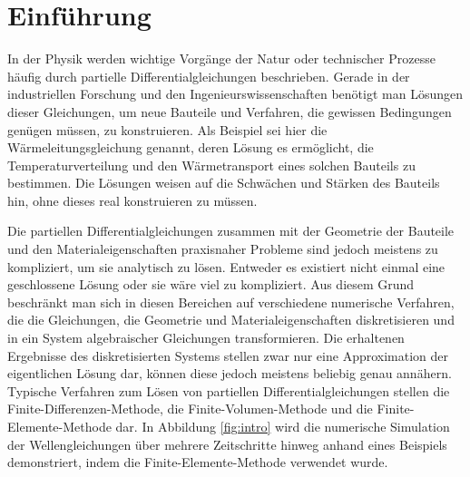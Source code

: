\documentclass[crop=false]{standalone}
\begin{document}
  \section{Einführung} %
  \label{sec:introduction}

    In der Physik werden wichtige Vorgänge der Natur oder technischer Prozesse häufig durch partielle Differentialgleichungen beschrieben.
    Gerade in der industriellen Forschung und den Ingenieurswissenschaften benötigt man Lösungen dieser Gleichungen, um neue Bauteile und Verfahren, die gewissen Bedingungen genügen müssen, zu konstruieren.
    Als Beispiel sei hier die Wärmeleitungsgleichung genannt, deren Lösung es ermöglicht, die Temperaturverteilung und den Wärmetransport eines solchen Bauteils zu bestimmen.
    Die Lösungen weisen auf die Schwächen und Stärken des Bauteils hin, ohne dieses real konstruieren zu müssen.
    \cite{Schweizer2013,Logan2007}

    Die partiellen Differentialgleichungen zusammen mit der Geometrie der Bauteile und den Materialeigenschaften praxisnaher Probleme sind jedoch meistens zu kompliziert, um sie analytisch zu lösen.
    Entweder es existiert nicht einmal eine geschlossene Lösung oder sie wäre viel zu kompliziert.
    Aus diesem Grund beschränkt man sich in diesen Bereichen auf verschiedene numerische Verfahren, die die Gleichungen, die Geometrie und Materialeigenschaften diskretisieren und in ein System algebraischer Gleichungen transformieren.
    Die erhaltenen Ergebnisse des diskretisierten Systems stellen zwar nur eine Approximation der eigentlichen Lösung dar, können diese jedoch meistens beliebig genau annähern.
    Typische Verfahren zum Lösen von partiellen Differentialgleichungen stellen die Finite-Differenzen-Methode, die Finite-Volumen-Methode und die Finite-Elemente-Methode dar.
    In Abbildung \ref{fig:intro} wird die numerische Simulation der Wellengleichungen über mehrere Zeitschritte hinweg anhand eines Beispiels demonstriert, indem die Finite-Elemente-Methode verwendet wurde.
    \cite{Schweizer2013,Logan2007,Cheney2008,Quarteroni2000}
\end{document}

